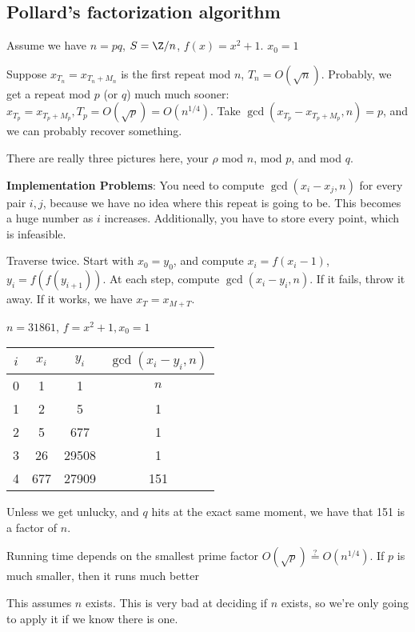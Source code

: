 \documentclass[twoside, 10pt]{article}
\begin{document}
\subsection{Pollard's factorization algorithm} Assume we have $n = pq$, $S = \Z /n$, $f(x) = x^2 + 1$. $x_0 = 1$

Suppose $x_{T_n} = x_{T_n + M_n}$ is the first repeat mod $n$, $T_n = O(\sqrt{n})$. Probably, we get a repeat mod $p$ (or $q$) much much sooner: $x_{T_p} = x_{T_p + M_p}, T_p = O(\sqrt{p}) = O(n^{1/4})$. Take $\gcd(x_{T_p} - x_{T_p + M_p}, n) = p$, and we can probably recover something. 

There are really three pictures here, your $\rho$ mod $n$, mod $p$, and mod $q$.

\textbf{Implementation Problems}: You need to compute $\gcd(x_i - x_j, n)$ for every pair $i, j$, because we have no idea where this repeat is going to be. This becomes a huge number as $i$ increases. Additionally, you have to store every point, which is infeasible.

\begin{defn}
    Traverse twice. Start with $x_0 = y_0$, and compute $x_i = f(x_i - 1)$, $y_i = f(f(y_{i + 1}))$. At each step, compute $\gcd(x_i - y_i, n)$. If it fails, throw it away. If it works, we have $x_T = x_{M + T}$.
\end{defn}

\begin{exm*}
    $n = 31861$, $f = x^2 + 1, x_0 = 1$
\end{exm*}

\begin{tabular}{c|c|c|c}
    $i$ & $x_i$ & $y_i$ & $\gcd(x_i - y_i, n)$\\
    \hline
    0 & 1 & 1 & $n$\\
    1 & 2 & 5 & 1\\
    2 & 5 & 677 & 1\\
    3 & 26 & 29508& 1\\
    4 & 677 &  27909 & 151\\
\end{tabular}

Unless we get unlucky, and $q$ hits at the exact same moment, we have that 151 is a factor of $n$.

Running time depends on the smallest prime factor $O(\sqrt{p}) \stackrel{?}{=} O(n^{1/4})$. If $p$ is much smaller, then it runs much better

\begin{rmk}
    This assumes $n$ exists. This is very bad at deciding if $n$ exists, so we're only going to apply it if we know there is one.
\end{rmk}
\end{document}
